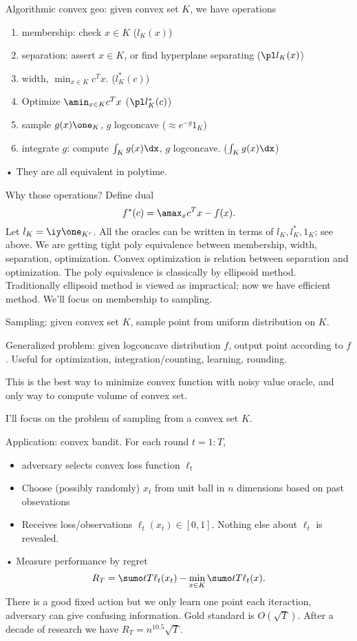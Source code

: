 Algorithmic convex geo: given convex set $K$, we have operations
\begin{enumerate}
\item
membership: check  $x\in K$ ($l_K(x)$)
\item
separation: assert $x\in K$, or find hyperplane separating ($\pl l_K(x)$)
\item
width, $\min_{x\in K}c^Tx$. ($l_K^*(c)$)
\item
Optimize $\amin_{x\in K} c^Tx$ ($\pl l_K^*(c)$)
\item
sample $g(x)\one_K$, $g$ logconcave ($\approx e^{-g}1_K$)
\item
integrate $g$: compute $\int_K g(x)\dx$, $g$ logconcave. ($\int_K g(x)\dx$)
\end{enumerate}•
They are all equivalent in polytime.

Why those operations? Define dual
$$
f^*(c) = \amax_x c^Tx - f(x).
$$
Let $l_K = \iy \one_{K^c}$. 
All the oracles can be written in terms of $l_K, l_K^*, 1_K$; see above. We are getting tight poly equivalence between membership, width, separation, optimization. Convex optimization is relation between separation and optimization. The poly equivalence is classically by ellipsoid method. Traditionally ellipsoid method is viewed as impractical; now we have efficient method.
We'll focus on membership to sampling.

Sampling: given convex set $K$, sample point from uniform distribution on $K$.

Generalized problem: given logconcave distribution $f$, output point according to $f$. Useful for optimization, integration/counting, learning, rounding. 

This is the best way to minimize convex function with noisy value oracle, and only way to compute volume of convex set. 

I'll focus on the problem of sampling from a convex set $K$.

Application: convex bandit. For each round $t=1:T$, 
\begin{itemize}
\item
adversary selects convex loss function $\ell_t$
\item
Choose (possibly randomly) $x_t$ from unit ball in $n$ dimensions based on past obsevations
\item
Receives loss/observations $\ell_t(x_t)\in [0,1]$.  Nothing else about $\ell_t$ is revealed.
\end{itemize}•
Measure performance by regret
$$
R_T = \sumo tT \ell_t(x_t) - \min_{x\in K}\sumo tT \ell_t(x).
$$
There is a good fixed action but we only learn one point each iteraction, adversary can give confusing information. Gold standard is $O(\sqrt T)$.
After a decade of research we have $R_T = n^{10.5}\sqrt T$.


